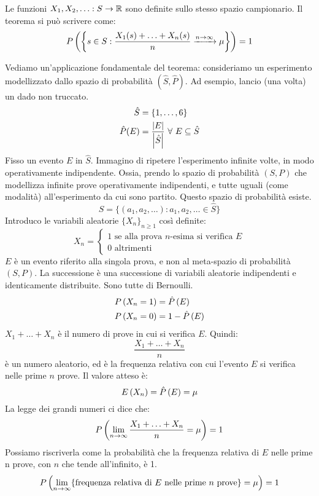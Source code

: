 Le funzioni $X_1, X_2, \ldots : S \to \reals$ sono definite sullo stesso spazio campionario. Il teorema si pu\`o scrivere come:
\[
\prob{ \left\{ s \in S : \frac{X_1(s) + \ldots + X_n(s)}{n} \xrightarrow{n \to \infty} \mu \right\}} = 1
\]
\begin{exmp}
Vediamo un'applicazione fondamentale del teorema: consideriamo un esperimento modellizzato dallo spazio di probabilit\`a $(\hat{S}, \hat{P})$. Ad esempio, lancio (una volta) un dado non truccato.
\begin{align*}
\hat{S} &= \{1, \ldots, 6\} \\
\hat{P}(E) &= \frac{\abs{E}}{\abs{\hat{S}}} \forall E \subseteq \hat{S}
\end{align*}
Fisso un evento $E$ in $\hat{S}$. Immagino di ripetere l'esperimento infinite volte, in modo operativamente indipendente. Ossia, prendo lo spazio di probabilit\`a $(S,P)$ che modellizza infinite prove operativamente indipendenti, e tutte uguali (come modalit\`a) all'esperimento da cui sono partito. Questo spazio di probabilit\`a esiste.
\[
S = \{ (a_1, a_2, \ldots) : a_1, a_2, \ldots \in \hat{S} \}
\]
Introduco le variabili aleatorie $\{X_n\}_{n \ge 1}$ cos\`i definite:
\[
X_n =
\begin{cases}
1 \text{ se alla prova $n$-esima si verifica $E$} \\
0 \text{ altrimenti}
\end{cases}
\]
$E$ \`e un evento riferito alla singola prova, e non al meta-spazio di probabilit\`a $(S,P)$. La successione \`e una successione di variabili aleatorie indipendenti e identicamente distribuite. Sono tutte di Bernoulli.
\begin{align*}
\prob{X_n = 1} &= \prob[\hat{P}]{E} \\
\prob{X_n = 0} &= 1 - \prob[\hat{P}]{E}
\end{align*}
$X_1 + \ldots + X_n$ \`e il numero di prove in cui si verifica $E$. Quindi:
\[
\frac{X_1 + \ldots + X_n}{n}
\]
\`e un numero aleatorio, ed \`e la frequenza relativa con cui l'evento $E$ si verifica nelle prime $n$ prove. Il valore atteso \`e:
\[
\expect{X_n} = \prob[\hat{P}]{E} = \mu
\]
La legge dei grandi numeri ci dice che:
\[
\prob{\lim_{n \to \infty} \frac{X_1 + \ldots + X_n}{n} = \mu} = 1
\]
Possiamo riscriverla come la probabilit\`a che la frequenza relativa di $E$ nelle prime n prove, con $n$ che tende all'infinito, \`e 1.
\[
\prob{\lim_{n \to \infty} \{\text{frequenza relativa di $E$ nelle prime $n$ prove}\} = \mu} = 1
\]
\end{exmp}

